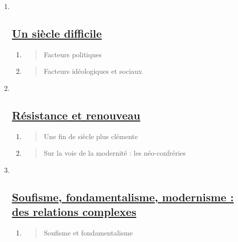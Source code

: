 \begin{enumerate}
\def\labelenumi{\Roman{enumi}.}
\item ~
  \hypertarget{un-siuxe8cle-difficile}{%
  \subsection{\texorpdfstring{\underline{Un siècle
  difficile}}{Un siècle difficile}}\label{un-siuxe8cle-difficile}}

  \begin{enumerate}
  \def\labelenumii{\arabic{enumii}.}
  \item
    \begin{quote}
    Facteurs politiques
    \end{quote}
  \item
    \begin{quote}
    Facteurs idéologiques et sociaux
    \end{quote}
  \end{enumerate}
\item ~
  \hypertarget{ruxe9sistance-et-renouveau}{%
  \subsection{\texorpdfstring{\underline{Résistance et
  renouveau}}{Résistance et renouveau}}\label{ruxe9sistance-et-renouveau}}

  \begin{enumerate}
  \def\labelenumii{\arabic{enumii}.}
  \item
    \begin{quote}
    Une fin de siècle plus clémente
    \end{quote}
  \item
    \begin{quote}
    Sur la voie de la modernité : les néo-confréries
    \end{quote}
  \end{enumerate}
\item ~
  \hypertarget{soufisme-fondamentalisme-modernisme-des-relations-complexes}{%
  \subsection{\texorpdfstring{\underline{Soufisme, fondamentalisme,
  modernisme : des relations
  complexes}}{Soufisme, fondamentalisme, modernisme : des relations complexes}}\label{soufisme-fondamentalisme-modernisme-des-relations-complexes}}

  \begin{enumerate}
  \def\labelenumii{\arabic{enumii}.}
  \item
    \begin{quote}
    Soufisme et fondamentalisme
    \end{quote}
  \end{enumerate}
\end{enumerate}

